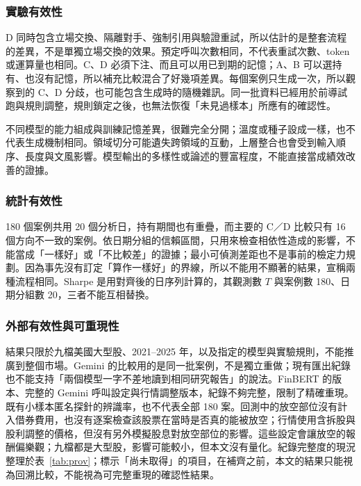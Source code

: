 \subsubsection{實驗有效性}
D 同時包含立場交換、隔離對手、強制引用與驗證重試，所以估計的是整套流程的差異，不是單獨立場交換的效果。預定呼叫次數相同，不代表重試次數、token 或運算量也相同。C、D 必須下注、而且可以用已到期的記憶；A、B 可以選持有、也沒有記憶，所以補充比較混合了好幾項差異。每個案例只生成一次，所以觀察到的 C、D 分歧，也可能包含生成時的隨機雜訊。同一批資料已經用於前導試跑與規則調整，規則鎖定之後，也無法恢復「未見過樣本」所應有的確認性。

不同模型的能力組成與訓練記憶差異，很難完全分開；溫度或種子設成一樣，也不代表生成機制相同。領域切分可能遺失跨領域的互動，上層整合也會受到輸入順序、長度與文風影響。模型輸出的多樣性或論述的豐富程度，不能直接當成績效改善的證據。

\subsubsection{統計有效性}
180 個案例共用 20 個分析日，持有期間也有重疊，而主要的 C／D 比較只有 16 個方向不一致的案例。依日期分組的信賴區間，只用來檢查相依性造成的影響，不能當成「一樣好」或「不比較差」的證據；最小可偵測差距也不是事前的檢定力規劃。因為事先沒有訂定「算作一樣好」的界線，所以不能用不顯著的結果，宣稱兩種流程相同。Sharpe 是用對齊後的日序列計算的，其觀測數 $T$ 與案例數 180、日期分組數 20，三者不能互相替換。

\subsubsection{外部有效性與可重現性}
結果只限於九檔美國大型股、2021--2025 年，以及指定的模型與實驗規則，不能推廣到整個市場。Gemini 的比較用的是同一批案例，不是獨立重做；現有匯出紀錄也不能支持「兩個模型一字不差地讀到相同研究報告」的說法。FinBERT 的版本、完整的 Gemini 呼叫設定與行情調整版本，紀錄不夠完整，限制了精確重現。既有小樣本匿名探針的辨識率，也不代表全部 180 案。回測中的放空部位沒有計入借券費用，也沒有逐案檢查該股票在當時是否真的能被放空；行情使用含拆股與股利調整的價格，但沒有另外模擬股息對放空部位的影響。這些設定會讓放空的報酬偏樂觀；九檔都是大型股，影響可能較小，但本文沒有量化。紀錄完整度的現況整理於表~\ref{tab:prov}；標示「尚未取得」的項目，在補齊之前，本文的結果只能視為回溯比較，不能視為可完整重現的確認性結果。

